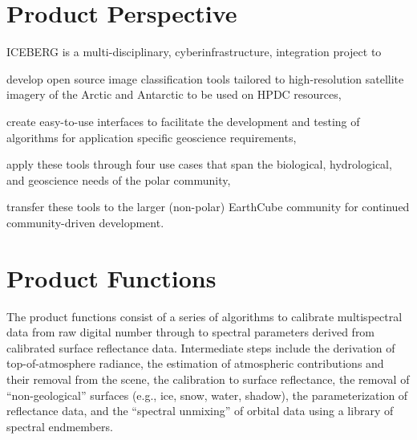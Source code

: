 \documentclass{scrreprt}
\begin{document}
\section{Product Perspective}

ICEBERG is a multi-disciplinary, cyberinfrastructure, integration project to 
\begin{inparaenum}[(1)]
	\item develop open source image classification tools tailored to high-resolution 
	satellite imagery of the Arctic and Antarctic to be used on HPDC resources,
	\item create easy-to-use interfaces to facilitate the development and testing 
	of algorithms for application specific geoscience requirements,
	\item apply these tools through four use cases that span the biological, 
	hydrological, and geoscience needs of the polar community,
	\item transfer these tools to the larger (non-polar) EarthCube community for 
	continued community-driven development.
\end{inparaenum}
\section{Product Functions}

The product functions consist of a series of algorithms to calibrate multispectral 
data from raw digital number through to spectral parameters derived from calibrated 
surface reflectance data.  Intermediate steps include the derivation of top-of-atmosphere 
radiance, the estimation of atmospheric contributions and their removal from the scene, 
the calibration to surface reflectance, the removal of ``non-geological'' surfaces 
(e.g., ice, snow, water, shadow), the parameterization of reflectance data, and the 
``spectral unmixing'' of orbital data using a library of spectral endmembers.
\end{document}
